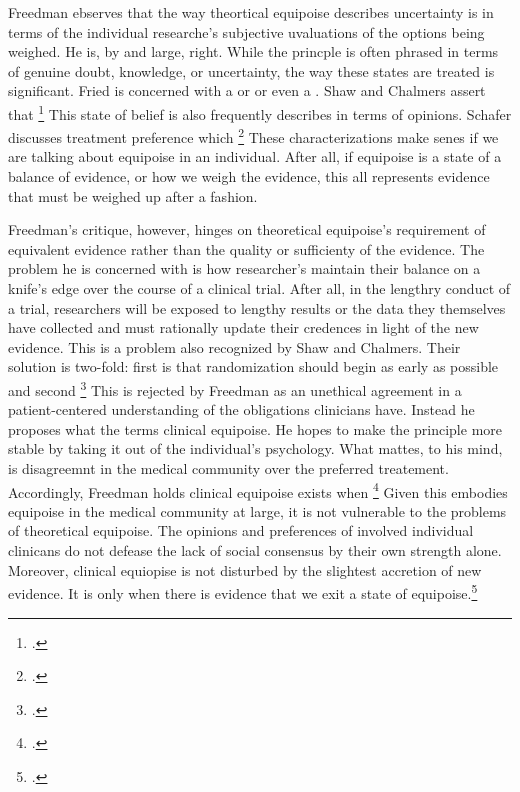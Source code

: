 \documentclass[letterpaper,notitlepage,12pt]{article}
\begin{document}
Freedman ebserves that the way theortical equipoise describes uncertainty is in
terms of the individual researche's subjective uvaluations of the options being
weighed.
He is, by and large, right.
While the princple is often phrased in terms of genuine doubt, knowledge, or
uncertainty, the way these states are treated is significant.
Fried is concerned with a  or or even a
.
Shaw and Chalmers assert that \footcite[p.
494]{shaw_ethics_1970}
This state of belief is also frequently describes in terms of opinions.
Schafer discusses treatment preference which \footcite[p. 5]{schafer_commentary_1985}
These characterizations make senes if we are talking about equipoise in an
individual.
After all, if equipoise is a state of a balance of evidence, or how we weigh the
evidence, this all represents evidence that must be weighed up after a fashion.

Freedman's critique, however, hinges on theoretical equipoise's requirement of
equivalent evidence rather than the quality or sufficienty of the evidence.
The problem he is concerned with is how researcher's maintain their balance on a
knife's edge over the course of a clinical trial.
After all, in the lengthry conduct of a trial, researchers will be exposed to
lengthy results or the data they themselves have collected and must rationally
update their credences in light of the new evidence.
This is a problem also recognized by Shaw and Chalmers.
Their solution is two-fold: first is that randomization should begin as early as
possible and second \footcite[p. 493]{shaw_ethics_1970}
This is rejected by Freedman as an unethical agreement in a patient-centered
understanding of the obligations clinicians have.
Instead he proposes what the terms clinical equipoise.
He hopes to make the principle more stable by taking it out of the individual's
psychology.
What mattes, to his mind, is disagreemnt in the medical community over the
preferred treatement.
Accordingly, Freedman holds clinical equipoise exists when \footcite[p.
430]{freedman_equipoise_1987}
Given this embodies equipoise in the medical community at large, it is not
vulnerable to the problems of theoretical equipoise.
The opinions and preferences of involved individual clinicans do not defease the
lack of social consensus by their own strength alone.
Moreover, clinical equiopise is not disturbed by the slightest accretion of new
evidence.
It is only when there is evidence  that we exit a state of equipoise.\footcite[p.
430]{freedman_equipoise_1987}
\end{document}
